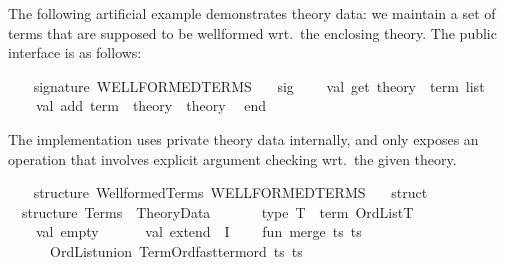 \begin{isabellebody}
\begin{isamarkuptext}
\begin{description}
  \end{description}%
\end{isamarkuptext}%
\isamarkuptrue%
%
\endisatagmlref
{\isafoldmlref}%
%
\isadelimmlref
%
\endisadelimmlref
%
\isadelimmlex
%
\endisadelimmlex
%
\isatagmlex
%
\begin{isamarkuptext}%
The following artificial example demonstrates theory
  data: we maintain a set of terms that are supposed to be wellformed
  wrt.\ the enclosing theory.  The public interface is as follows:%
\end{isamarkuptext}%
\isamarkuptrue%
%
\endisatagmlex
{\isafoldmlex}%
%
\isadelimmlex
%
\endisadelimmlex
%
\isadelimML
%
\endisadelimML
%
\isatagML
{}\isamarkupfalse%
\ {\isacharverbatimopen}\isanewline
\ \ signature\ WELLFORMED{\isacharunderscore}TERMS\ {\isacharequal}\isanewline
\ \ sig\isanewline
\ \ \ \ val\ get{\isacharcolon}\ theory\ {\isacharminus}{\isachargreater}\ term\ list\isanewline
\ \ \ \ val\ add{\isacharcolon}\ term\ {\isacharminus}{\isachargreater}\ theory\ {\isacharminus}{\isachargreater}\ theory\isanewline
\ \ end{\isacharsemicolon}\isanewline
{\isacharverbatimclose}%
\endisatagML
{\isafoldML}%
%
\isadelimML
%
\endisadelimML
%
\begin{isamarkuptext}%
The implementation uses private theory data internally, and
  only exposes an operation that involves explicit argument checking
  wrt.\ the given theory.%
\end{isamarkuptext}%
\isamarkuptrue%
%
\isadelimML
%
\endisadelimML
%
\isatagML
{}\isamarkupfalse%
\ {\isacharverbatimopen}\isanewline
\ \ structure\ Wellformed{\isacharunderscore}Terms{\isacharcolon}\ WELLFORMED{\isacharunderscore}TERMS\ {\isacharequal}\isanewline
\ \ struct\isanewline
\isanewline
\ \ structure\ Terms\ {\isacharequal}\ Theory{\isacharunderscore}Data\isanewline
\ \ {\isacharparenleft}\isanewline
\ \ \ \ type\ T\ {\isacharequal}\ term\ Ord{\isacharunderscore}List{\isachardot}T{\isacharsemicolon}\isanewline
\ \ \ \ val\ empty\ {\isacharequal}\ {\isacharbrackleft}{\isacharbrackright}{\isacharsemicolon}\isanewline
\ \ \ \ val\ extend\ {\isacharequal}\ I{\isacharsemicolon}\isanewline
\ \ \ \ fun\ merge\ {\isacharparenleft}ts{}{\isacharcomma}\ ts{}{\isacharparenright}\ {\isacharequal}\isanewline
\ \ \ \ \ \ Ord{\isacharunderscore}List{\isachardot}union\ Term{\isacharunderscore}Ord{\isachardot}fast{\isacharunderscore}term{\isacharunderscore}ord\ ts{}\ ts{}{\isacharsemicolon}\isanewline
\ \ {\isacharparenright}{\isacharsemicolon}\isanewline

\end{isabellebody}
